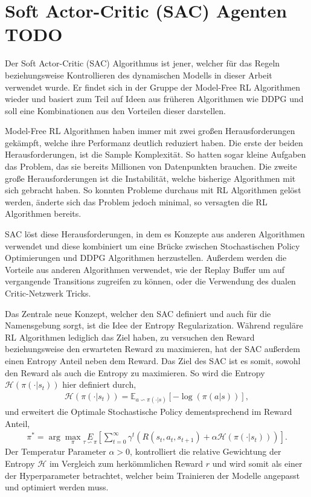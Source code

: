 \documentclass[]{iat}
\begin{document}
\section{Soft Actor-Critic (SAC) Agenten TODO} \label{sec:howto_sac}
Der Soft Actor-Critic (SAC) Algorithmus ist jener, welcher für das Regeln beziehungsweise Kontrollieren des dynamischen Modells in dieser Arbeit verwendet wurde. Er findet sich in der Gruppe der Model-Free RL Algorithmen wieder und basiert zum Teil auf Ideen aus früheren Algorithmen wie DDPG und soll eine Kombinationen aus den Vorteilen dieser darstellen.

Model-Free RL Algorithmen haben immer mit zwei großen Herausforderungen gekämpft, welche ihre Performanz deutlich reduziert haben. Die erste der beiden Herausforderungen, ist die Sample Komplexität. So hatten sogar kleine Aufgaben das Problem, das sie bereits Millionen von Datenpunkten brauchen. Die zweite große Herausforderungen ist die Instabilität, welche bisherige Algorithmen mit sich gebracht haben. So konnten Probleme durchaus mit RL Algorithmen gelöst werden, änderte sich das Problem jedoch minimal, so versagten die RL Algorithmen bereits. \cite[]{sac}

SAC löst diese Herausforderungen, in dem es Konzepte aus anderen Algorithmen verwendet und diese kombiniert um eine Brücke zwischen Stochastischen Policy Optimierungen und DDPG Algorithmen herzustellen. Außerdem werden die Vorteile aus anderen Algorithmen verwendet, wie der Replay Buffer um auf vergangende Transitions zugreifen zu können, oder die Verwendung des dualen Critic-Netzwerk Tricks. \cite[]{brockman2016openai}

Das Zentrale neue Konzept, welcher den SAC definiert und auch für die Namensgebung sorgt, ist die Idee der Entropy Regularization. Während reguläre RL Algorithmen lediglich das Ziel haben, zu versuchen den Reward beziehungsweise den erwarteten Reward zu maximieren, hat der SAC außerdem einen Entropy Anteil neben dem Reward. Das Ziel des SAC ist es somit, sowohl den Reward als auch die Entropy zu maximieren. So wird die Entropy $\mathcal{H}(\pi(\cdot | s_t))$ hier definiert durch,
\begin{align}
    \mathcal{H}(\pi(\cdot | s_t)) = \mathbb{E}_{a\backsim \pi(\cdot | s)}[-\log(\pi(a|s))],
\end{align}
und erweitert die Optimale Stochastische Policy dementsprechend im Reward Anteil,
\begin{align}
    \pi^* = \arg \max_{\pi} \underset{\tau \backsim \pi}{E} \left[\sum_{t=0}^{\infty} \gamma^t\left(R(s_t, a_t, s_{t+1}) + \alpha \mathcal{H}(\pi(\cdot | s_t))\right)  \right].
\end{align}
Der Temperatur Parameter $\alpha > 0$, kontrolliert die relative Gewichtung der Entropy $\mathcal{H}$ im Vergleich zum herkömmlichen Reward $r$ und wird somit als einer der Hyperparameter betrachtet, welcher beim Trainieren der Modelle angepasst und optimiert werden muss.
\end{document}
